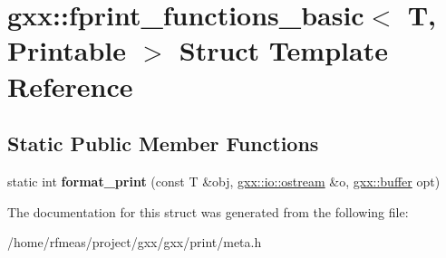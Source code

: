 \hypertarget{structgxx_1_1fprint__functions__basic}{}\section{gxx\+:\+:fprint\+\_\+functions\+\_\+basic$<$ T, Printable $>$ Struct Template Reference}
\label{structgxx_1_1fprint__functions__basic}
\subsection*{Static Public Member Functions}
\begin{DoxyCompactItemize}
\item 
static int {\bfseries format\+\_\+print} (const T \&obj, \hyperlink{classgxx_1_1io_1_1ostream}{gxx\+::io\+::ostream} \&o, \hyperlink{classgxx_1_1buffer}{gxx\+::buffer} opt)\hypertarget{structgxx_1_1fprint__functions__basic_a031728abf548691e4bf5e8fe4f9ee30b}{}\label{structgxx_1_1fprint__functions__basic_a031728abf548691e4bf5e8fe4f9ee30b}

\end{DoxyCompactItemize}


The documentation for this struct was generated from the following file\+:\begin{DoxyCompactItemize}
\item 
/home/rfmeas/project/gxx/gxx/print/meta.\+h\end{DoxyCompactItemize}
